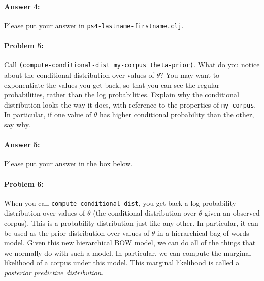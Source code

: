 \documentclass[10pt]{article}
\newenvironment{AnswerBox}{\begin{mdframed}[style=simple]}{\end{mdframed}}
\newcommand{\PSnum}{4}
\begin{document}
\paragraph{Answer 4:} Please put your answer in
\texttt{ps\PSnum-lastname-firstname.clj}.

\hrulefill %

\paragraph{Problem 5:}
Call \texttt{(compute-conditional-dist my-corpus theta-prior)}. What
do you notice about the conditional distribution over values of
$\theta$?  You may want to exponentiate the values you get back, so
that you can see the regular probabilities, rather than the log
probabilities. Explain why the conditional distribution looks the way
it does, with reference to the properties of \texttt{my-corpus}.  In
particular, if one value of $\theta$ has higher conditional probability
than the other, say why.

\paragraph{Answer 5:} Please put your answer in the box below.

\begin{AnswerBox}%

    
\end{AnswerBox}%

\hrulefill %

\paragraph{Problem 6:}
When you call \texttt{compute-conditional-dist}, you get back a log
probability distribution over values of $\theta$ (the conditional
distribution over $\theta$ given an observed corpus). This is a
probability distribution just like any other. In particular, it can be
used as the prior distribution over values of $\theta$ in a
hierarchical bag of words model. Given this new hierarchical BOW
model, we can do all of the things that we normally do with such a
model. In particular, we can compute the marginal likelihood of a
corpus under this model. This marginal likelihood is called a
\emph{posterior predictive distribution}.
\end{document}
